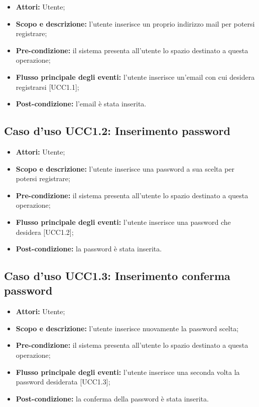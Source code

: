 \begin{itemize}
\item \textbf{Attori:} Utente;
\item \textbf{Scopo e descrizione:} l'utente inserisce un proprio indirizzo mail per potersi registrare;
\item \textbf{Pre-condizione:} il sistema presenta all'utente lo spazio destinato a questa operazione;
\item \textbf{Flusso principale degli eventi:} l'utente inserisce un'email con cui desidera registrarsi [UCC1.1];
\item \textbf{Post-condizione:} l'email è stata inserita.
\end{itemize}

\subsection{Caso d'uso UCC1.2: Inserimento password}

\begin{itemize}
\item \textbf{Attori:} Utente;
\item \textbf{Scopo e descrizione:} l'utente inserisce una password a sua scelta per potersi registrare;
\item \textbf{Pre-condizione:} il sistema presenta all'utente lo spazio destinato a questa operazione;
\item \textbf{Flusso principale degli eventi:} l'utente inserisce una password che desidera [UCC1.2];
\item \textbf{Post-condizione:} la password è stata inserita.
\end{itemize}

\subsection{Caso d'uso UCC1.3: Inserimento conferma password}

\begin{itemize}
\item \textbf{Attori:} Utente;
\item \textbf{Scopo e descrizione:} l'utente inserisce nuovamente la password scelta;
\item \textbf{Pre-condizione:} il sistema presenta all'utente lo spazio destinato a questa operazione;
\item \textbf{Flusso principale degli eventi:} l'utente inserisce una seconda volta la password desiderata [UCC1.3];
\item \textbf{Post-condizione:} la conferma della password è stata inserita.
\end{itemize}


